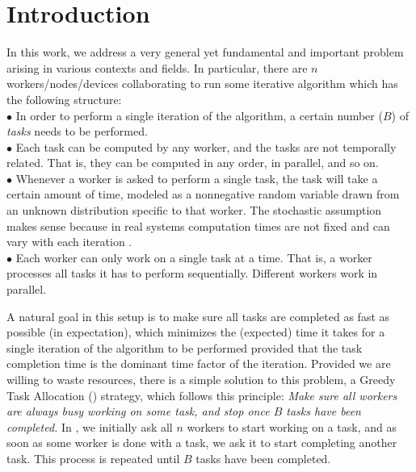 \section{Introduction}
\label{section:introduction}

In this work, we address a very general yet fundamental and important problem arising in various contexts and fields. In particular, there are $n$ workers/nodes/devices collaborating to run some iterative algorithm which has the following structure: \\
\phantom{X} $\bullet$ In order to perform a single iteration of the algorithm, a certain number ($B$) of {\em tasks} needs to be performed.\\
\phantom{X} $\bullet$ Each task can be computed by any worker, and the tasks are not temporally related. That is, they can be computed in any order, in parallel, and so on. \\
\phantom{X} $\bullet$ Whenever  a worker is asked to perform a single task, the task will take a certain amount of time, modeled as a nonnegative random variable drawn from an unknown distribution specific to that worker. The stochastic assumption makes sense because in real systems computation times are not fixed and can vary with each iteration \citep{dean2013tail,chen2016revisiting, dutta2018slow, maranjyan2024mindflayer}. \\
\phantom{X} $\bullet$ Each worker can only work on a single task at a time. That is, a worker processes all tasks it has to perform sequentially.  Different workers work in parallel.




A natural goal in this setup is to make sure all tasks are completed as fast as possible (in expectation), which minimizes the (expected) time it takes for a single iteration of the algorithm to be performed provided that the task completion time is the dominant time factor of the iteration. Provided we are willing to waste resources, there is a simple solution to this problem, a Greedy Task Allocation () strategy, which follows this principle:
{\em Make sure all workers are always busy working on some task, and stop once $B$ tasks have been completed.}
In , we initially ask all $n$ workers to start working on a task, and as soon as some worker is done with a task, we ask it to start completing another task. This process is repeated until $B$ tasks have been completed.

